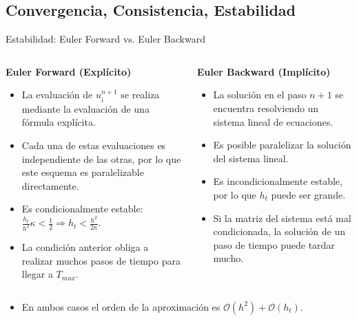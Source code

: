 \documentclass{beamer}
\begin{document}
\subsection{Convergencia, Consistencia, Estabilidad}

\begin{frame}
\begin{center}
\end{center}
\end{frame}

\begin{frame}{Estabilidad: Euler Forward vs. Euler Backward}

\begin{small}

\begin{columns}
\begin{column}{0.45\textwidth}
\textbf{Euler Forward (Expl\'icito)}

\begin{itemize}
\item La evaluaci\'on de $u_i^{n+1}$ se realiza mediante la evaluaci\'on de una f\'ormula expl\'icita.
\item Cada una de estas evaluaciones es independiente de las otras, por lo que este esquema es paralelizable directamente.
\item Es condicionalmente estable: $\frac{h_t}{h^2} \kappa < \frac{1}{2} \Longrightarrow h_t < \frac{h^2}{2 \kappa}$.
\item La condici\'on anterior obliga a realizar muchos pasos de tiempo para llegar a $T_{max}$.
\end{itemize}
\end{column}
\begin{column}{0.45\textwidth}
\textbf{Euler Backward (Impl\'icito)}
\begin{itemize}
\item La soluci\'on en el paso $n+1$ se encuentra resolviendo un sistema lineal de ecuaciones.
\item Es posible paralelizar la soluci\'on del sistema lineal.
\item Es incondicionalmente estable, por lo que $h_t$ puede ser grande.
\item Si la matriz del sistema est\'a mal condicionada, la soluci\'on de un paso de tiempo puede tardar mucho.
\end{itemize}
\end{column}
\end{columns}

\begin{itemize}
\item En ambos casos el orden de la aproximaci\'on es $\mathcal{O}(h^2) + \mathcal{O}(h_t)$.
\end{itemize}
\end{small}

\end{frame}
\end{document}
